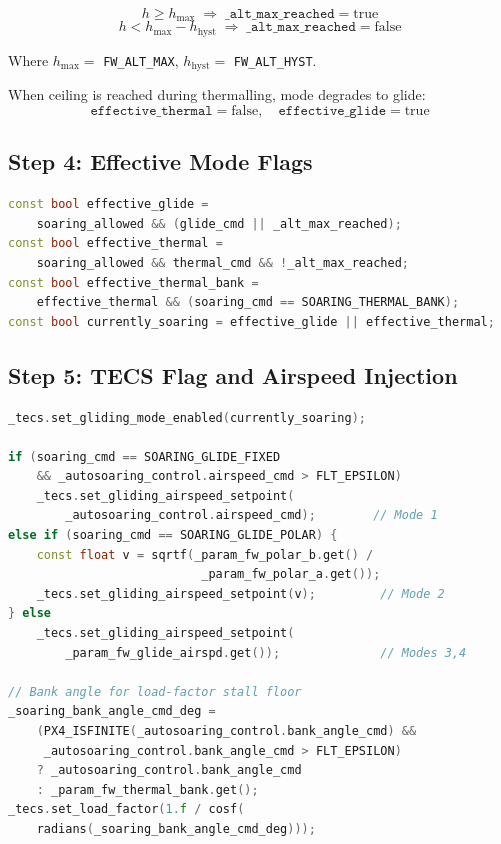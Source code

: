 \documentclass[12pt,a4paper]{article}
\begin{document}
\begin{equation}
  h \geq h_{\max} \;\Rightarrow\; \texttt{\_alt\_max\_reached} = \text{true}
\end{equation}
\begin{equation}
  h < h_{\max} - h_{\text{hyst}} \;\Rightarrow\; \texttt{\_alt\_max\_reached} = \text{false}
\end{equation}

Where $h_{\max} = $ \texttt{FW\_ALT\_MAX}, $h_{\text{hyst}} = $ \texttt{FW\_ALT\_HYST}.

When ceiling is reached during thermalling, mode degrades to glide:
\begin{equation}
  \texttt{effective\_thermal} = \text{false}, \quad \texttt{effective\_glide} = \text{true}
\end{equation}

\subsection{Step 4: Effective Mode Flags}

\begin{lstlisting}[language=C++]
const bool effective_glide =
    soaring_allowed && (glide_cmd || _alt_max_reached);
const bool effective_thermal =
    soaring_allowed && thermal_cmd && !_alt_max_reached;
const bool effective_thermal_bank =
    effective_thermal && (soaring_cmd == SOARING_THERMAL_BANK);
const bool currently_soaring = effective_glide || effective_thermal;
\end{lstlisting}

\subsection{Step 5: TECS Flag and Airspeed Injection}

\begin{lstlisting}[language=C++]
_tecs.set_gliding_mode_enabled(currently_soaring);

if (soaring_cmd == SOARING_GLIDE_FIXED
    && _autosoaring_control.airspeed_cmd > FLT_EPSILON)
    _tecs.set_gliding_airspeed_setpoint(
        _autosoaring_control.airspeed_cmd);        // Mode 1
else if (soaring_cmd == SOARING_GLIDE_POLAR) {
    const float v = sqrtf(_param_fw_polar_b.get() /
                           _param_fw_polar_a.get());
    _tecs.set_gliding_airspeed_setpoint(v);         // Mode 2
} else
    _tecs.set_gliding_airspeed_setpoint(
        _param_fw_glide_airspd.get());              // Modes 3,4

// Bank angle for load-factor stall floor
_soaring_bank_angle_cmd_deg =
    (PX4_ISFINITE(_autosoaring_control.bank_angle_cmd) &&
     _autosoaring_control.bank_angle_cmd > FLT_EPSILON)
    ? _autosoaring_control.bank_angle_cmd
    : _param_fw_thermal_bank.get();
_tecs.set_load_factor(1.f / cosf(
    radians(_soaring_bank_angle_cmd_deg)));
\end{lstlisting}
\end{document}
